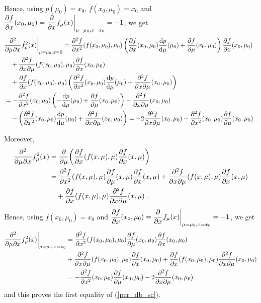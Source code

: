 \begin{rmk}
\begin{align*}
\end{align*}
Hence, using $p(\mu_0) = x_0$, $f(x_0,\mu_0)=x_0$ and
$\displaystyle \pdydx{f}{x}(x_0,\mu_0) =
\pdfdx{f_{\mu}(x)}{x}\bigg|_{\mu=\mu_0,x=x_0} = -1$, we get
\begin{align*}
&\pdfdxnm{\hat{f}_{\mu}^2(x)}{\mu}{x}{2}{}{} \bigg|_{\mu=\mu_0,x=0}
= \pdydxn{f}{x}{2}(f(x_0,\mu_0),\mu_0)
\left( \pdydx{f}{x}(x_0,\mu_0) \dydx{p}{\mu}(\mu_0)
+ \pdydx{f}{\mu}(x_0,\mu_0) \right)
\pdydx{f}{x}(x_0,\mu_0) \\
&\quad + \pdydxnm{f}{x}{\mu}{2}{}{}(f(x_0,\mu_0),\mu_0) \pdydx{f}{x}(x_0,\mu_0)
 \\
&\quad +\pdydx{f}{x}(f(x_0,\mu_0),\mu_0)
\left( \pdydxn{f}{x}{2}(x_0,\mu_0) \dydx{p}{\mu}(\mu_0)
+ \pdydxnm{f}{x}{\mu}{2}{}{}(x_0,\mu_0) \right) \\
&= -\pdydxn{f}{x}{2}(x_0,\mu_0) \left( - \dydx{p}{\mu}(\mu_0)
+ \pdydx{f}{\mu}(x_0,\mu_0) \right) - \pdydxnm{f}{x}{\mu}{2}{}{}(x_0,\mu_0) \\
&\quad - \left( \pdydxn{f}{x}{2}(x_0,\mu_0) \dydx{p}{\mu}(\mu_0) 
+ \pdydxnm{f}{x}{\mu}{2}{}{}(x_0,\mu_0) \right)
= - 2 \pdydxnm{f}{x}{\mu}{2}{}{}(x_0,\mu_0)
 - \pdydxn{f}{x}{2}(x_0,\mu_0)\pdydx{f}{\mu}(x_0,\mu_0) \ .
\end{align*}

Moreover,
\begin{align*}
\pdfdxnm{f_{\mu}^2(x)}{\mu}{x}{2}{}{}
&= \pdfdx{\left(\pdydx{f}{x}(f(x,\mu),\mu)
\pdydx{f}{x}(x,\mu) \right)}{\mu} \\
&= \pdydxn{f}{x}{2}(f(x,\mu),\mu) \pdydx{f}{\mu}(x,\mu)
\pdydx{f}{x}(x,\mu) + \pdydxnm{f}{x}{\mu}{2}{}{}(f(x,\mu),\mu)
\pdydx{f}{x}(x,\mu) \\
&\quad + \pdydx{f}{x}(f(x,\mu),\mu) \pdydxnm{f}{x}{\mu}{2}{}{}(x,\mu) \ .
\end{align*}
Hence, using $f(x_0,\mu_0)=x_0$ and
$\displaystyle \pdydx{f}{x}(x_0,\mu_0) =
\pdfdx{f_{\mu}(x)}{x} \bigg|_{\mu=\mu_0,x=x_0} = -1$, we get
\begin{align*}
\pdfdxnm{f_{\mu}^2(x) }{\mu}{x}{2}{}{} \bigg|_{\mu=\mu_0,x=x_0} &= 
\pdydxn{f}{x}{2}(f(x_0,\mu_0),\mu_0) \pdydx{f}{\mu}(x_0,\mu_0)
\pdydx{f}{x}(x_0,\mu_0) \\
& + \pdydxnm{f}{x}{\mu}{2}{}{}(f(x_0,\mu_0),\mu_0) \pdydx{f}{x}(x_0,\mu_0)
+\pdydx{f}{x}(f(x_0,\mu_0),\mu_0)
\pdydxnm{f}{x}{\mu}{2}{}{}(x_0,\mu_0) \\
&= -\pdydxn{f}{x}{2}(x_0,\mu_0) \pdydx{f}{\mu}(x_0,\mu_0)
- 2 \pdydxnm{f}{x}{\mu}{2}{}{}(x_0,\mu_0)
\end{align*}
and this proves the first equality of (\ref{per_db_sc}).
\end{rmk}

